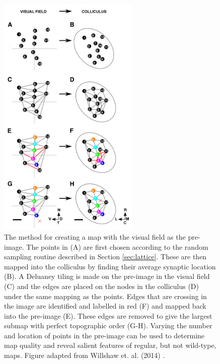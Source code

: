 \begin{figure}[h!]
	\centering
	\includegraphics[width =0.6\textwidth]{images/introduction/lattice_procedure}
	\def\c{The method for creating a map with the visual field as the pre-image. }
	\caption[\c]{\label{fig:lattice_procedure} \c The points in (A) are first chosen according to the random sampling routine described in Section \ref{sec:lattice}. These are then mapped into the colliculus by finding their average synaptic location (B). A Deluaney tiling is made on the pre-image in the visual field (C) and the edges are placed on the nodes in the colliculus (D) under the same mapping as the points. Edges that are crossing in the image are identified and labelled in red (F) and mapped back into the pre-image (E). These edges are removed to give the largest submap with perfect topographic order (G-H). Varying the number and location of points in the pre-image can be used to determine map quality and reveal salient features of regular, but not wild-type, maps. Figure adapted from Willshaw et. al. (2014) \cite{Willshaw2014-ms}.} 
\end{figure}

